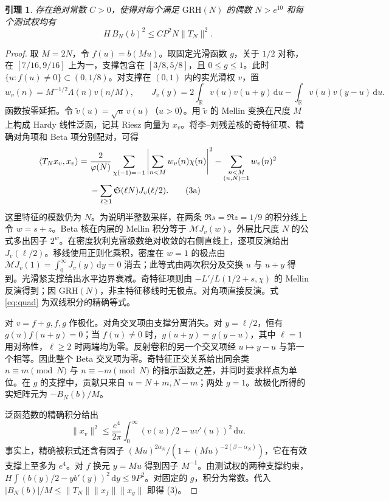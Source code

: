 \documentclass[UTF8,a4paper,11pt,fontset=fandol]{ctexart}
\newtheorem{lemma}[theorem]{引理}
\newcommand{\Sg}{\mathfrak S}
\newcommand{\RR}{\mathbb R}
\newcommand{\Lam}{\Lambda}
\newcommand{\dd}{\,\mathrm d}
\newcommand{\GRH}{\mathrm{GRH}}
\begin{document}
\begin{lemma}\label{le:transfer}
存在绝对常数 \(C>0\)，使得对每个满足 \(\GRH(N)\) 的偶数 \(N>e^{10}\) 和每个测试权均有
\[
                     H\,B_N(b)^2\le C P^2 N\|T_N\|^2.         \tag{3}
\]
\end{lemma}
\begin{proof}
取 \(M=2N\)，令 \(f(u)=b(Mu)\)。取固定光滑函数 \(g\)，关于 \(1/2\) 对称，在 \([7/16,9/16]\) 上为一，支撑包含在 \([3/8,5/8]\)，且 \(0\le g\le1\)。此时 \(\{u:f(u)\ne0\}\subset (0,1/8)\)。对支撑在 \((0,1)\) 内的实光滑权 \(v\)，置
\[
 w_v(n)=M^{-1/2}\Lam(n)v(n/M),\qquad
 J_v(y)=2\int_{\RR}v(u)v(u+y)\dd u-\int_{\RR}v(u)v(y-u)\dd u .
\]
函数按零延拓。令 \(\widetilde v(u)=\sqrt u\,v(u)\)（\(u>0\)）。用 \(\widetilde v\) 的 Mellin 变换在尺度 \(M\) 上构成 Hardy 线性泛函，记其 Riesz 向量为 \(x_v\)。将李--刘残差核的奇特征项、精确对角项和 Beta 项分别配对，可得
\begin{align}
 \langle T_N x_v,x_v\rangle
 ={}&\frac{2}{\varphi(N)}\sum_{\chi(-1)=-1}
     \left|\sum_{n<M}w_v(n)\chi(n)\right|^2
       -\sum_{\substack{n<M\\(n,N)=1}}w_v(n)^2 \notag\\[-2pt]
    &-\sum_{\ell\ge1}\Sg(\ell N)J_v(\ell/2).                  \tag{3a}\label{eq:quad}
\end{align}
这里特征的模数仍为 \(N\)。为说明半整数采样，在两条 \(\Re s=\Re z=1/9\) 的积分线上令 \(w=s+z\)。Beta 核在内层的 Mellin 积分等于 \(\mathcal M J_v(w)\)。外层比尺度 \(N\) 的公式多出因子 \(2^w\)。在密度狄利克雷级数绝对收敛的右侧直线上，逐项反演给出 \(J_v(\ell/2)\)。移线使用正则化乘积，密度在 \(w=1\) 的极点由
\(\mathcal M J_v(1)=\int_0^\infty J_v(y)\dd y=0\) 消去；此等式由两次积分及交换 \(u\) 与 \(u+y\) 得到。光滑紧支撑给出水平边界衰减。奇特征项则由 \(-L'/L(1/2+s,\chi)\) 的 Mellin 反演得到；因 \(\GRH(N)\)，非主特征移线时无极点。对角项直接反演。式 \eqref{eq:quad} 为双线积分的精确等式。

对 \(v=f+g,f,g\) 作极化。对角交叉项由支撑分离消失。对 \(y=\ell/2\)，恒有 \(g(u)f(u+y)=0\)；当 \(f(u)\ne0\) 时，\(g(u+y)=g(y-u)\)，其中 \(\ell=1\) 用对称性，\(\ell\ge2\) 时两端均为零。反射卷积的另一个交叉项经 \(u\mapsto y-u\) 与第一个相等。因此整个 Beta 交叉项为零。奇特征正交关系给出同余类 \(n\equiv m\pmod N\) 与 \(n\equiv-m\pmod N\) 的指示函数之差，并同时要求样点为单位。在 \(g\) 的支撑中，贡献只来自 \(n=N+m,N-m\)；两处 \(g=1\)。故极化所得的实矩阵元为 \(-B_N(b)/M\)。

泛函范数的精确积分给出
\[
 \|x_v\|^2\le\frac{e^4}{2\pi}
       \int_0^\infty\left(v(u)/2-u v'(u)\right)^2\dd u .
\]
事实上，精确被积式还含有因子
\((Mu)^{2\alpha_N}/(1+(Mu)^{-2(\beta-\alpha_N)})\)，它在有效支撑上至多为 \(e^4\)。对 \(f\) 换元 \(y=Mu\) 得到因子 \(M^{-1}\)。由测试权的两种支撑约束，\(H\int (b(y)/2-yb'(y))^2\dd y\le 9P^2\)。对固定的 \(g\)，积分为常数。代入
\(|B_N(b)|/M\le\|T_N\|\|x_f\|\|x_g\|\) 即得 (3)。
\end{proof}
\end{document}
